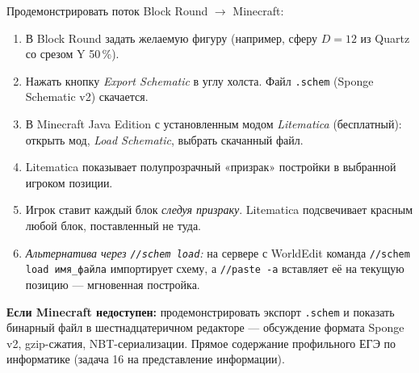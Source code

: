 \documentclass[12pt,a4paper]{scrartcl}
\newcommand{\cmd}[1]{\textcolor{earth}{\texttt{\small #1}}}
\newcommand{\tempo}[1]{\textnormal{\footnotesize\color{bg!90!white}\textsf{#1}}}
\begin{document}
\begin{zadanie}[5.2 --- Экспорт и импорт \quad\tempo{15 мин}]\label{at:52}
Продемонстрировать поток Block Round $\rightarrow$ Minecraft:

\begin{enumerate}[leftmargin=1.5em,itemsep=0.2em,topsep=0.3em]
  \item В Block Round задать желаемую фигуру (например, сферу $D = 12$ из Quartz со срезом Y 50\,\%).
  \item Нажать кнопку \emph{Export Schematic} в углу холста. Файл \texttt{.schem} (Sponge Schematic v2) скачается.
  \item В Minecraft Java Edition с установленным модом \emph{Litematica} (бесплатный): открыть мод, \emph{Load Schematic}, выбрать скачанный файл.
  \item Litematica показывает полупрозрачный «призрак» постройки в выбранной игроком позиции.
  \item Игрок ставит каждый блок \emph{следуя призраку}. Litematica подсвечивает красным любой блок, поставленный не туда.
  \item \emph{Альтернатива через \cmd{//schem load}:} на сервере с WorldEdit команда \cmd{//schem load имя\_файла} импортирует схему, а \cmd{//paste -a} вставляет её на текущую позицию --- мгновенная постройка.
\end{enumerate}

\textbf{Если Minecraft недоступен:} продемонстрировать экспорт \texttt{.schem} и показать бинарный файл в шестнадцатеричном редакторе --- обсуждение формата Sponge v2, gzip-сжатия, NBT-сериализации. Прямое содержание профильного ЕГЭ по информатике (задача 16 на представление информации).
\end{zadanie}
\end{document}
